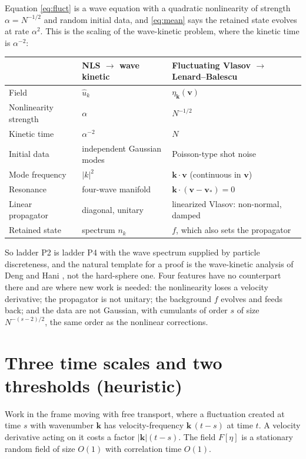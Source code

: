 \documentclass[11pt]{article}
\newcommand{\bv}{\mathbf{v}}
\newcommand{\bk}{\mathbf{k}}
\theoremstyle{definition}
\begin{document}
Equation \eqref{eq:fluct} is a wave equation with a quadratic nonlinearity of
strength $\alpha = N^{-1/2}$ and random initial data, and \eqref{eq:mean} says
the retained state evolves at rate $\alpha^2$. This is the scaling of the
wave-kinetic problem, where the kinetic time is $\alpha^{-2}$:
\begin{center}
\renewcommand{\arraystretch}{1.4}
\begin{tabular}{>{\raggedright}p{4.0cm}>{\raggedright}p{4.6cm}p{5.6cm}}
  & NLS $\to$ wave kinetic & Fluctuating Vlasov $\to$ Lenard--Balescu \\ \hline
  Field & $\hat u_k$ & $\eta_{\bk}(\bv)$ \\
  Nonlinearity strength & $\alpha$ & $N^{-1/2}$ \\
  Kinetic time & $\alpha^{-2}$ & $N$ \\
  Initial data & independent Gaussian modes & Poisson-type shot noise \\
  Mode frequency & $|k|^2$ & $\bk\cdot\bv$ (continuous in $\bv$) \\
  Resonance & four-wave manifold & $\bk\cdot(\bv - \bv_*) = 0$ \\
  Linear propagator & diagonal, unitary & linearized Vlasov: non-normal, damped \\
  Retained state & spectrum $n_k$ & $f$, which also sets the propagator \\
\end{tabular}
\end{center}
So ladder P2 is ladder P4 with the wave spectrum supplied by particle
discreteness, and the natural template for a proof is the wave-kinetic
analysis of Deng and Hani \cite{DH-WKE,DH-long}, not the hard-sphere one.
Four features have no counterpart there and are where new work is needed:
the nonlinearity loses a velocity derivative; the propagator is not unitary;
the background $f$ evolves and feeds back; and the data are not Gaussian, with
cumulants of order $s$ of size $N^{-(s-2)/2}$, the same order as the
nonlinear corrections.

\section{Three time scales and two thresholds (heuristic)}
\label{sec:scales}

Work in the frame moving with free transport, where a fluctuation created at
time $s$ with wavenumber $\bk$ has velocity-frequency $\bk\,(t-s)$ at time
$t$. A velocity derivative acting on it costs a factor $|\bk|(t-s)$. The
field $F[\eta]$ is a stationary random field of size $O(1)$ with correlation
time $O(1)$.
\end{document}
